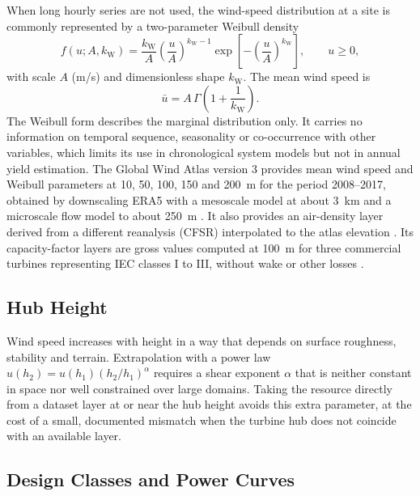 When long hourly series are not used, the wind-speed distribution at a
site is commonly represented by a two-parameter Weibull density
\begin{equation}
    f(u;A,k_{\mathrm{W}})
    = \frac{k_{\mathrm{W}}}{A}\left(\frac{u}{A}\right)^{k_{\mathrm{W}}-1}
      \exp\!\left[-\left(\frac{u}{A}\right)^{k_{\mathrm{W}}}\right],
    \qquad u\ge 0,
    \label{eq:wind_weibull_pdf}
\end{equation}
with scale $A$ (m/s) and dimensionless shape $k_{\mathrm{W}}$. The mean
wind speed is
\begin{equation}
    \bar{u} = A\,\Gamma\!\left(1+\frac{1}{k_{\mathrm{W}}}\right).
    \label{eq:wind_weibull_mean}
\end{equation}
The Weibull form describes the marginal distribution only. It carries
no information on temporal sequence, seasonality or co-occurrence with
other variables, which limits its use in chronological system models
but not in annual yield estimation. The Global Wind Atlas version 3
provides mean wind speed and Weibull parameters at 10, 50, 100, 150 and
200~m for the period 2008--2017, obtained by downscaling ERA5 with a
mesoscale model at about 3~km and a microscale flow model to about 250~m
\cite{davis2023globalwindatlas,dtuwind2019gwa3release,gwaV3dataset}. It
also provides an air-density layer derived from a different reanalysis
(CFSR) interpolated to the atlas elevation \cite{gwaV3dataset}. Its
capacity-factor layers are gross values computed at 100~m for three
commercial turbines representing IEC classes I to III, without wake or
other losses \cite{davis2023globalwindatlas}.

\subsection{Hub Height}
\label{subsec:wind_hub_height_theory}

Wind speed increases with height in a way that depends on surface
roughness, stability and terrain. Extrapolation with a power law
$u(h_2)=u(h_1)(h_2/h_1)^{\alpha}$ requires a shear exponent $\alpha$
that is neither constant in space nor well constrained over large
domains. Taking the resource directly from a dataset layer at or near
the hub height avoids this extra parameter, at the cost of a small,
documented mismatch when the turbine hub does not coincide with an
available layer.

\subsection{Design Classes and Power Curves}
\label{subsec:wind_classes_curves}

